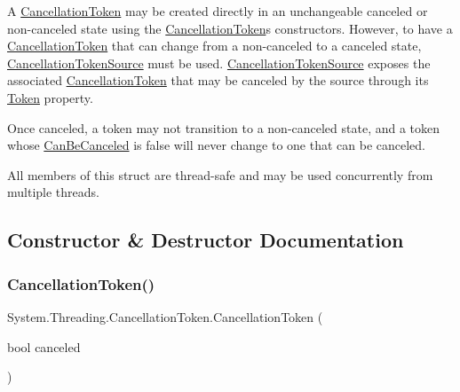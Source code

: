 A \hyperlink{struct_system_1_1_threading_1_1_cancellation_token}{Cancellation\+Token} may be created directly in an unchangeable canceled or non-\/canceled state using the \hyperlink{struct_system_1_1_threading_1_1_cancellation_token}{Cancellation\+Token}\textquotesingle{}s constructors. However, to have a \hyperlink{struct_system_1_1_threading_1_1_cancellation_token}{Cancellation\+Token} that can change from a non-\/canceled to a canceled state, \hyperlink{class_system_1_1_threading_1_1_cancellation_token_source}{Cancellation\+Token\+Source} must be used. \hyperlink{class_system_1_1_threading_1_1_cancellation_token_source}{Cancellation\+Token\+Source} exposes the associated \hyperlink{struct_system_1_1_threading_1_1_cancellation_token}{Cancellation\+Token} that may be canceled by the source through its \hyperlink{class_system_1_1_threading_1_1_cancellation_token_source_a2ab44a79f438139faf4f7dcce1b3e5b2}{Token} property. 

Once canceled, a token may not transition to a non-\/canceled state, and a token whose \hyperlink{struct_system_1_1_threading_1_1_cancellation_token_ae9726dbc54733ce5d174707fc596b8e9}{Can\+Be\+Canceled} is false will never change to one that can be canceled. 

All members of this struct are thread-\/safe and may be used concurrently from multiple threads. 

\subsection{Constructor \& Destructor Documentation}
\mbox{\label{struct_system_1_1_threading_1_1_cancellation_token_a95dbce917e10c35de78ca57155fdfee4}} 
\subsubsection{\texorpdfstring{Cancellation\+Token()}{CancellationToken()}}
{\footnotesize\ttfamily System.\+Threading.\+Cancellation\+Token.\+Cancellation\+Token (\begin{DoxyParamCaption}\item[{bool}]{canceled }\end{DoxyParamCaption})\hspace{0.3cm}{\ttfamily [inline]}}




